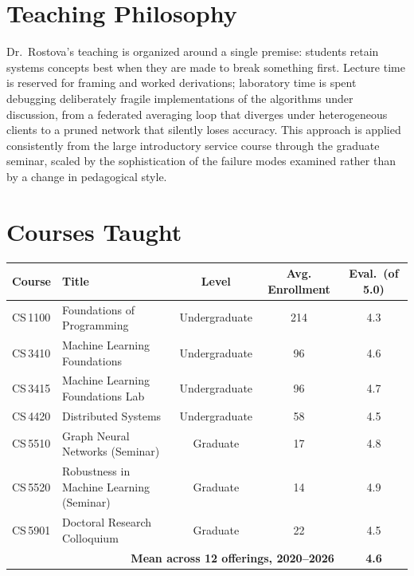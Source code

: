 
\section{Teaching Philosophy}
Dr.\ Rostova's teaching is organized around a single premise: students retain systems concepts best when they are made to break something first. Lecture time is reserved for framing and worked derivations; laboratory time is spent debugging deliberately fragile implementations of the algorithms under discussion, from a federated averaging loop that diverges under heterogeneous clients to a pruned network that silently loses accuracy. This approach is applied consistently from the large introductory service course through the graduate seminar, scaled by the sophistication of the failure modes examined rather than by a change in pedagogical style.

\section{Courses Taught}
\begin{center}
\begin{tabularx}{\linewidth}{@{}lXccc@{}}
\toprule
\textbf{Course} & \textbf{Title} & \textbf{Level} & \textbf{Avg. Enrollment} & \textbf{Eval.\ (of 5.0)} \\
\midrule
CS\,1100 & Foundations of Programming & Undergraduate & 214 & 4.3 \\{}
CS\,3410 & Machine Learning Foundations & Undergraduate & 96 & 4.6 \\{}
CS\,3415 & Machine Learning Foundations Lab & Undergraduate & 96 & 4.7 \\{}
CS\,4420 & Distributed Systems & Undergraduate & 58 & 4.5 \\{}
CS\,5510 & Graph Neural Networks (Seminar) & Graduate & 17 & 4.8 \\{}
CS\,5520 & Robustness in Machine Learning (Seminar) & Graduate & 14 & 4.9 \\{}
CS\,5901 & Doctoral Research Colloquium & Graduate & 22 & 4.5 \\
\midrule
\multicolumn{4}{r}{\textbf{Mean across 12 offerings, 2020--2026}} & \textbf{4.6} \\
\bottomrule
\end{tabularx}
\end{center}

